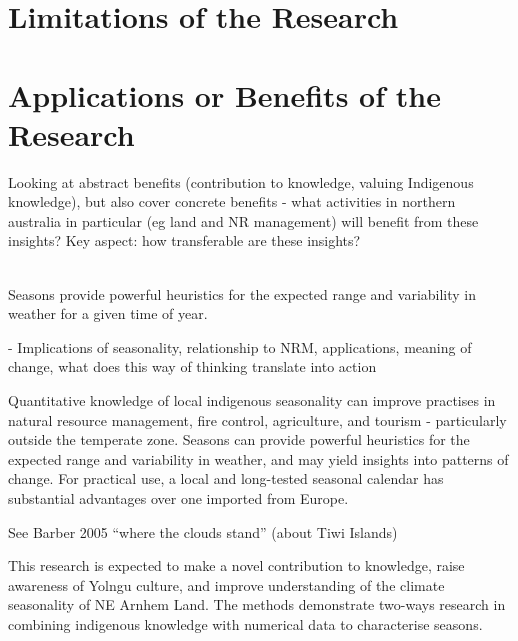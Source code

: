


\section{Limitations of the Research}
\label{sec:disc-limitations}




\section{Applications or Benefits of the Research}
\label{sec:applications-benefits}
Looking at abstract benefits (contribution to knowledge, valuing Indigenous knowledge),
but also cover concrete benefits - what activities in northern australia
in particular (eg land and NR management) will benefit from these insights?
Key aspect: how transferable are these insights?

~\\

Seasons provide powerful heuristics for the expected range and variability in
weather for a given time of year.

-	Implications of seasonality, relationship to NRM, applications, meaning of
change, what does this way of thinking translate into action


Quantitative knowledge of local indigenous seasonality can improve practises in
natural resource management, fire control, agriculture, and tourism -
particularly outside the temperate zone.  Seasons can provide powerful
heuristics for the expected range and variability in weather, and may yield
insights into patterns of change.  For practical use, a local and long-tested
seasonal calendar has substantial advantages over one imported from Europe.


See Barber 2005 ``where the clouds stand'' (about Tiwi Islands)

This research is expected to make a novel contribution to knowledge, raise
awareness of Yolngu culture, and improve understanding of the climate
seasonality of NE Arnhem Land.  The methods demonstrate two-ways research in
combining indigenous knowledge with numerical data to characterise seasons.

